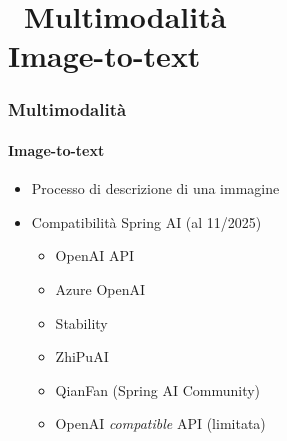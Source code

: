 \section{\faWrench\ Multimodalità\\\small{Image-to-text}} %
\label{sec:spring-itt}
%
\begin{frame}[t,fragile] \frametitle{Multimodalità}
    \framesubtitle{Image-to-text}
    {\footnotesize
    \begin{itemize}[leftmargin=10pt,align=right]
        \item[\alert{\faArrowCircleRight}] Processo di descrizione di una immagine
        \item[\alert{\faArrowCircleRight}] Compatibilità Spring AI (al 11/2025)
        \begin{itemize}[leftmargin=10pt,align=right]
            \item[\alert{\faArrowCircleRight}] OpenAI API
            \item[\alert{\faArrowCircleRight}] Azure OpenAI
            \item[\alert{\faArrowCircleRight}] Stability
            \item[\alert{\faArrowCircleRight}] ZhiPuAI
            \item[\alert{\faArrowCircleRight}] QianFan (Spring AI Community)
            \item[\alert{\faArrowCircleRight}] OpenAI \textit{compatible} API (limitata)
        \end{itemize}
    \end{itemize}
    }
\end{frame} 
%
